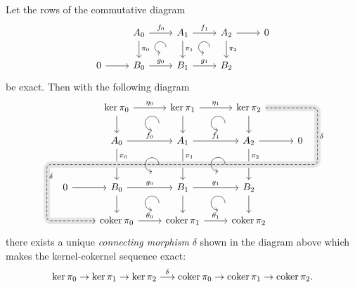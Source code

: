 \begin{lem}\label{snake lemma}
    Let the rows of the commutative diagram
    \[\begin{tikzcd}[every matrix/.append style={name=m},   
        execute at end picture={\draw [<-] ([xshift=-8mm,yshift=-10mm]m-1-3.north) arc[start angle=-90,delta angle=-270,radius=0.2cm];
        \draw [<-] ([xshift=-8mm,yshift=-10mm]m-1-4.north) arc[start angle=-90,delta angle=-270,radius=0.2cm];}]
        & A_0\arrow[r,"f_0"]\arrow[d,"\pi_0"] & A_1 \arrow[r,"f_1"]\arrow[d,"\pi_1"] & A_2\arrow[d,"\pi_2"]\arrow[r] & 0\\
       0\arrow[r] & B_0\arrow[r,"g_0"] & B_1\arrow[r,"g_1"] &B_2 & 
    \end{tikzcd}\]
    be exact. Then with the following diagram
    \[\begin{tikzcd}[background color=gray!20,every matrix/.append style={name=m},   
        execute at end picture={\draw [<-] ([xshift=-11mm,yshift=1mm]m-2-4.north) arc[start angle=-90,delta angle=-270,radius=0.25cm];
        \draw [<-] ([xshift=-11mm,yshift=-3mm]m-3-4.north) arc[start angle=-90,delta angle=-270,radius=0.25cm];
        \draw [<-] ([xshift=-11mm,yshift=1mm]m-5-4.north) arc[start angle=-90,delta angle=-270,radius=0.25cm];
        \draw [<-] ([xshift=-11mm,yshift=1mm]m-2-5.north) arc[start angle=-90,delta angle=-270,radius=0.25cm];
        \draw [<-] ([xshift=-11mm,yshift=3mm]m-4-5.north) arc[start angle=-90,delta angle=-270,radius=0.25cm];
        \draw [<-] ([xshift=-11mm,yshift=1mm]m-5-5.north) arc[start angle=-90,delta angle=-270,radius=0.25cm];}]
        & & \ker \pi_0 \ar{r}{\eta_0} \ar{d} & \ker \pi_1\ar{r}{\eta_1} \ar{d} &  \ker \pi_2 \ar{d}   %
        & & \\
        &  &  A_0 \ar{r}{f_0} \ar{dd}[near start]{\pi_0} & A_1 \ar{r}{f_1} \ar{dd}[near start]{\pi_1} &  A_2\ar{r}\ar{dd}[near start]{\pi_2} & 0 &  ~\\[-1mm]
        & & &  ~ & & \ar[r, phantom, ""{coordinate, name=Y}] & ~\\[-3mm]
        ~&  \ar[l, phantom, ""{coordinate, name=Z}] 0 \ar{r} &  B_0 \ar{r}{g_0} \ar{d} &  B_1 \ar{r}{g_1} \ar{d} &  B_2 \ar{d} & &  \\
              & &  \ar[from=uuuurr, "\delta", dashed,crossing over, rounded corners,
                      to path=
                              { -- ([xshift=2ex]\tikztostart.east)
                              -| (Y) [near end]\tikztonodes
                              -| (Z) [near end]\tikztonodes
                              |- ([xshift=-2ex]\tikztotarget.west)
                               -- (\tikztotarget)}
                    ] \coker \pi_0\ar{r}{\theta_0}
               &  \coker \pi_1 \ar{r}{\theta_1}
               &  \coker \pi_2
               & 
               & 
    \end{tikzcd}\]
    there exists a unique \emph{connecting morphism} $\delta$ shown in the diagram above which makes the kernel-cokernel sequence exact:
    \[\ker\pi_0 \to \ker\pi_1\to\ker\pi_2 \overset\delta\longrightarrow \operatorname{coker}\pi_0\to \operatorname{coker}\pi_1\to\operatorname{coker}\pi_2.\]


\end{lem}
